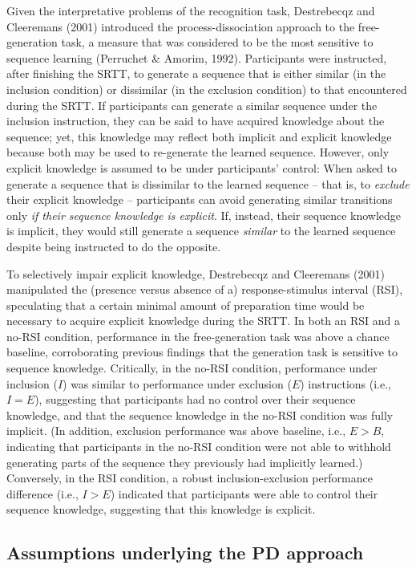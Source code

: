 \documentclass[man]{apa6}
\theoremstyle{definition}
\theoremstyle{definition}
\theoremstyle{definition}
\theoremstyle{remark}
\begin{document}
Given the interpretative problems of the recognition task, Destrebecqz
and Cleeremans (2001) introduced the process-dissociation approach to
the free-generation task, a measure that was considered to be the most
sensitive to sequence learning (Perruchet \& Amorim, 1992). Participants
were instructed, after finishing the SRTT, to generate a sequence that
is either similar (in the inclusion condition) or dissimilar (in the
exclusion condition) to that encountered during the SRTT. If
participants can generate a similar sequence under the inclusion
instruction, they can be said to have acquired knowledge about the
sequence; yet, this knowledge may reflect both implicit and explicit
knowledge because both may be used to re-generate the learned sequence.
However, only explicit knowledge is assumed to be under participants'
control: When asked to generate a sequence that is dissimilar to the
learned sequence -- that is, to \emph{exclude} their explicit knowledge
-- participants can avoid generating similar transitions only \emph{if
their sequence knowledge is explicit}. If, instead, their sequence
knowledge is implicit, they would still generate a sequence
\emph{similar} to the learned sequence despite being instructed to do
the opposite.

To selectively impair explicit knowledge, Destrebecqz and Cleeremans
(2001) manipulated the (presence versus absence of a) response-stimulus
interval (RSI), speculating that a certain minimal amount of preparation
time would be necessary to acquire explicit knowledge during the SRTT.
In both an RSI and a no-RSI condition, performance in the
free-generation task was above a chance baseline, corroborating previous
findings that the generation task is sensitive to sequence knowledge.
Critically, in the no-RSI condition, performance under inclusion (\(I\))
was similar to performance under exclusion (\(E\)) instructions (i.e.,
\(I=E\)), suggesting that participants had no control over their
sequence knowledge, and that the sequence knowledge in the no-RSI
condition was fully implicit. (In addition, exclusion performance was
above baseline, i.e., \(E > B\), indicating that participants in the
no-RSI condition were not able to withhold generating parts of the
sequence they previously had implicitly learned.) Conversely, in the RSI
condition, a robust inclusion-exclusion performance difference (i.e.,
\(I > E\)) indicated that participants were able to control their
sequence knowledge, suggesting that this knowledge is explicit.

\subsection{Assumptions underlying the PD
approach}\label{assumptions-underlying-the-pd-approach}
\end{document}
